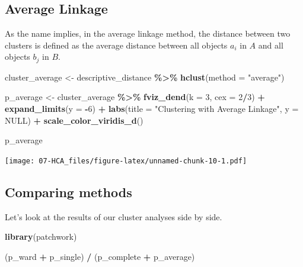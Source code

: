 \documentclass[
]{book}
\newenvironment{Shaded}{\begin{snugshade}}{\end{snugshade}}
\newcommand{\AttributeTok}[1]{\textcolor[rgb]{0.13,0.29,0.53}{#1}}
\newcommand{\ConstantTok}[1]{\textcolor[rgb]{0.56,0.35,0.01}{#1}}
\newcommand{\DecValTok}[1]{\textcolor[rgb]{0.00,0.00,0.81}{#1}}
\newcommand{\FunctionTok}[1]{\textcolor[rgb]{0.13,0.29,0.53}{\textbf{#1}}}
\newcommand{\NormalTok}[1]{#1}
\newcommand{\OtherTok}[1]{\textcolor[rgb]{0.56,0.35,0.01}{#1}}
\newcommand{\SpecialCharTok}[1]{\textcolor[rgb]{0.81,0.36,0.00}{\textbf{#1}}}
\newcommand{\StringTok}[1]{\textcolor[rgb]{0.31,0.60,0.02}{#1}}
\begin{document}
\subsection{Average Linkage}\label{average-linkage}

As the name implies, in the average linkage method, the distance between two clusters is defined as the average distance between all objects \(a_i\) in \(A\) and all objects \(b_j\) in \(B\).

\begin{Shaded}
\begin{Highlighting}[]
\NormalTok{cluster\_average }\OtherTok{\textless{}{-}}
\NormalTok{  descriptive\_distance }\SpecialCharTok{\%\textgreater{}\%}
  \FunctionTok{hclust}\NormalTok{(}\AttributeTok{method =} \StringTok{"average"}\NormalTok{)}

\NormalTok{p\_average }\OtherTok{\textless{}{-}} 
\NormalTok{  cluster\_average }\SpecialCharTok{\%\textgreater{}\%}
  \FunctionTok{fviz\_dend}\NormalTok{(}\AttributeTok{k =} \DecValTok{3}\NormalTok{, }\AttributeTok{cex =} \DecValTok{2}\SpecialCharTok{/}\DecValTok{3}\NormalTok{) }\SpecialCharTok{+}
  \FunctionTok{expand\_limits}\NormalTok{(}\AttributeTok{y =} \SpecialCharTok{{-}}\DecValTok{6}\NormalTok{) }\SpecialCharTok{+} 
  \FunctionTok{labs}\NormalTok{(}\AttributeTok{title =} \StringTok{"Clustering with Average Linkage"}\NormalTok{, }\AttributeTok{y =} \ConstantTok{NULL}\NormalTok{) }\SpecialCharTok{+} 
  \FunctionTok{scale\_color\_viridis\_d}\NormalTok{()}

\NormalTok{p\_average}
\end{Highlighting}
\end{Shaded}

\texttt{[image: 07-HCA\_files/figure-latex/unnamed-chunk-10-1.pdf]}

\subsection{Comparing methods}\label{comparing-methods}

Let's look at the results of our cluster analyses side by side.

\begin{Shaded}
\begin{Highlighting}[]
\FunctionTok{library}\NormalTok{(patchwork)}

\NormalTok{(p\_ward }\SpecialCharTok{+}\NormalTok{ p\_single) }\SpecialCharTok{/}\NormalTok{ (p\_complete }\SpecialCharTok{+}\NormalTok{ p\_average)}
\end{Highlighting}
\end{Shaded}
\end{document}
